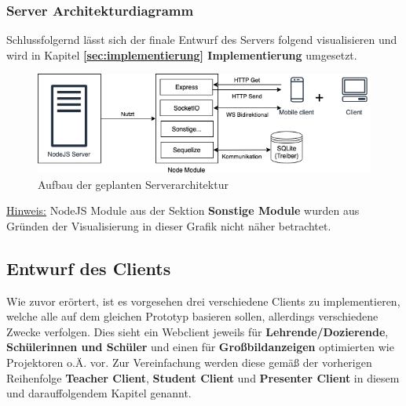 \subsubsection{Server Architekturdiagramm}\label{sec:serverarchitekt}
Schlussfolgernd lässt sich der finale Entwurf des Servers folgend visualisieren und wird in Kapitel \textbf{\ref{sec:implementierung} Implementierung} umgesetzt.

\begin{figure}[H]
	\centering
	\includegraphics[width=0.8\linewidth]{bilder/server_architektur}
	\caption[Aufbau der geplanten Serverarchitektur]{Aufbau der geplanten Serverarchitektur}
	\label{fig:server_diagram}
\end{figure}
\footnotesize \underline{Hinweis:} NodeJS Module aus der Sektion \textbf{Sonstige Module} wurden aus Gründen der Visualisierung in dieser Grafik nicht näher betrachtet.

\normalsize 
\subsection{Entwurf des Clients}\label{sec:clientkonzept}
Wie zuvor erörtert, ist es vorgesehen drei verschiedene Clients zu implementieren, welche alle auf dem gleichen Prototyp basieren sollen, allerdings verschiedene Zwecke verfolgen. Dies sieht ein Webclient jeweils für \textbf{Lehrende/Dozierende}, \textbf{Schülerinnen und Schüler} und einen für \textbf{Großbildanzeigen} optimierten wie Projektoren o.Ä. vor. Zur Vereinfachung werden diese gemäß der vorherigen Reihenfolge \textbf{Teacher Client}, \textbf{Student Client} und \textbf{Presenter Client} in diesem und darauffolgendem Kapitel genannt.\\ \\ 

